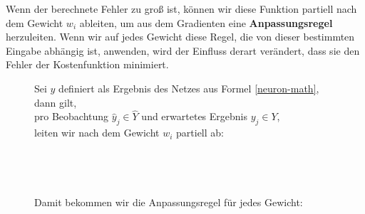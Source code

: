                 \noindent
                Wenn der berechnete Fehler zu groß ist, können wir diese Funktion partiell nach dem Gewicht $w_i$ ableiten, um aus dem Gradienten eine \textbf{Anpassungsregel} herzuleiten. Wenn wir auf jedes Gewicht diese Regel, die von dieser bestimmten Eingabe abhängig ist, anwenden, wird der Einfluss derart verändert, dass sie den Fehler der Kostenfunktion minimiert.

                \begin{figure}[H]
                    \begin{mdframed}
                        \noindent
                        Sei $\widehat{y}$ definiert als Ergebnis des Netzes aus Formel \ref{neuron-math}, dann gilt, \\
                        pro Beobachtung $\widehat{y}_j \in \widehat{Y}$ und erwartetes Ergebnis $y_j \in Y$, \\
                        leiten wir nach dem Gewicht $w_i$ partiell ab:\\[4mm]
    \hspace*{40mm}  \\[2mm]
    \hspace*{62.3mm}  \\[2mm]
    \hspace*{62.3mm}  \\[2mm]
    \hspace*{62.3mm} \\[4mm]
                        Damit bekommen wir die Anpassungsregel für jedes Gewicht:\\[4mm]
                        \hspace*{40mm} 
\end{mdframed}
\end{figure}
